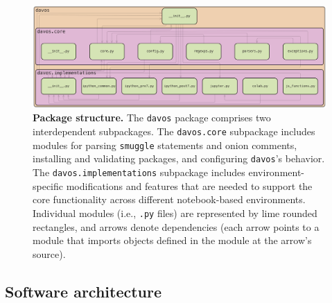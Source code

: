 \documentclass[preprint,12pt,a4paper]{elsarticle}
\begin{document}
\begin{figure}[tp]
\centering
\includegraphics[width=\textwidth]{figs/package_structure}
\caption{\small \textbf{Package structure.} The \texttt{davos} package
  comprises two interdependent subpackages.  The \texttt{davos.core}
  subpackage includes modules for parsing \texttt{smuggle} statements
  and onion comments, installing and validating packages, and
  configuring \texttt{davos}'s behavior.  The
  \texttt{davos.implementations} subpackage includes
  environment-specific modifications and features that are needed to
  support the core functionality across different notebook-based
  environments.  Individual modules (i.e., \texttt{.py} files) are represented by lime
  rounded rectangles, and arrows denote dependencies (each arrow
  points to a module that imports objects defined in the module at the
  arrow's source).}
\label{fig:package-structure}
\end{figure}

\subsection{Software architecture}
\end{document}
